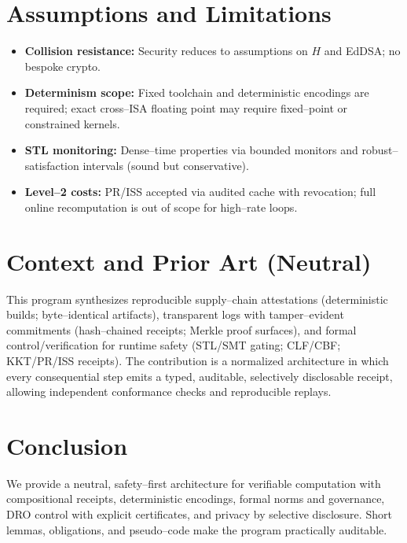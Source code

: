 \documentclass[11pt]{article}
\theoremstyle{plain}
\theoremstyle{definition}
\theoremstyle{remark}
\begin{document}
\section{Assumptions and Limitations}
\begin{itemize}
  \item \textbf{Collision resistance:} Security reduces to assumptions on $H$ and EdDSA; no bespoke crypto.
  \item \textbf{Determinism scope:} Fixed toolchain and deterministic encodings are required; exact cross--ISA floating point may require fixed--point or constrained kernels.
  \item \textbf{STL monitoring:} Dense--time properties via bounded monitors and robust--satisfaction intervals (sound but conservative).
  \item \textbf{Level--2 costs:} PR/ISS accepted via audited cache with revocation; full online recomputation is out of scope for high--rate loops.
\end{itemize}

\section{Context and Prior Art (Neutral)}
This program synthesizes reproducible supply--chain attestations (deterministic builds; byte--identical artifacts), transparent logs with tamper--evident commitments (hash--chained receipts; Merkle proof surfaces), and formal control/verification for runtime safety (STL/SMT gating; CLF/CBF; KKT/PR/ISS receipts). The contribution is a normalized architecture in which every consequential step emits a typed, auditable, selectively disclosable receipt, allowing independent conformance checks and reproducible replays.

\section{Conclusion}
We provide a neutral, safety--first architecture for verifiable computation with compositional receipts, deterministic encodings, formal norms and governance, DRO control with explicit certificates, and privacy by selective disclosure. Short lemmas, obligations, and pseudo--code make the program practically auditable.
\end{document}
